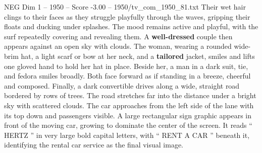\begin{textsample}{NEG Dim 1 – 1950 – Score -3.00 – 1950/tv\_com\_1950\_81.txt}
Their wet hair clings to their faces as they struggle playfully through the waves, gripping their floats and ducking under splashes.
The mood remains active and playful, with the surf repeatedly covering and revealing them.
A \textbf{well-dressed} couple then appears against an open sky with clouds.
The woman, wearing a rounded wide-brim hat, a light scarf or bow at her neck, and a \textbf{tailored} jacket, smiles and lifts one gloved hand to hold her hat in place.
Beside her, a man in a dark suit, tie, and fedora smiles broadly.
Both face forward as if standing in a breeze, cheerful and composed.
Finally, a dark convertible drives along a wide, straight road bordered by rows of trees.
The road stretches far into the distance under a bright sky with scattered clouds.
The car approaches from the left side of the lane with its top down and passengers visible.
A large rectangular sign graphic appears in front of the moving car, growing to dominate the center of the screen.
It reads “ HERTZ ” in very large bold capital letters, with “ RENT A CAR ” beneath it, identifying the rental car service as the final visual image.

\end{textsample}
